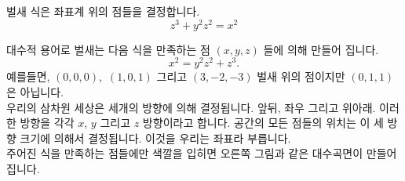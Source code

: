 \begin{surferPage}{벌새}
식은 좌표계 위의 점들을 결정합니다. \\
  
  \smallskip
\[z^3+ y^2	z^2	= x^2\]

\singlespacing
대수적 용어로 벌새는 다음 식을 만족하는 점 $(x, y, z)$ 들에 의해 만들어 집니다.
\smallskip
\[ x^2= y^2z^2+z^3.\]
\smallskip
예를들면, $(0,0,0),$ $(1,0,1)$ 그리고 $(3,-2,-3)$ 벌새 위의 점이지만 $(0,1,1)$ 은 아닙니다.\\
 \singlespacing
우리의 삼차원 세상은 세개의 방향에 의해 결정됩니다. 앞뒤, 좌우 그리고 위아래. 이러한 방향을 각각 $x$, $y$ 그리고 $z$ 방향이라고 합니다. 공간의 모든 점들의 위치는 이 세 방향 크기에 의해서 결정됩니다. 이것을 우리는 좌표라 부릅니다.\\
\singlespacing
주어진 식을 만족하는 점들에만 색깔을 입히면 오른쪽 그림과 같은 대수곡면이 만들어 집니다.
\end{surferPage}
